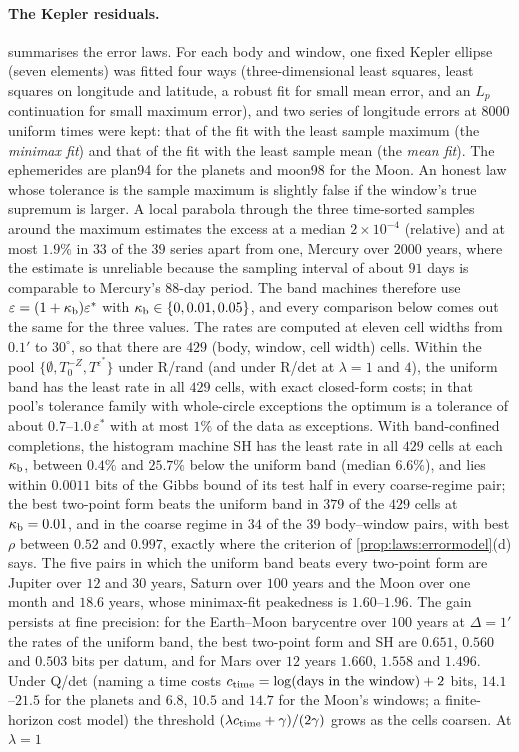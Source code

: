 \paragraph{The Kepler residuals.}  summarises the error laws. For each body and window, one fixed Kepler ellipse (seven elements) was fitted four ways (three-dimensional least squares, least squares on longitude and latitude, a robust fit for small mean error, and an $L_p$ continuation for small maximum error), and two series of longitude errors at $8000$ uniform times were kept: that of the fit with the least sample maximum (the \emph{minimax fit}) and that of the fit with the least sample mean (the \emph{mean fit}). The ephemerides are plan94 for the planets and moon98 for the Moon. An honest law whose tolerance is the sample maximum is slightly false if the window's true supremum is larger. A local parabola through the three time-sorted samples around the maximum estimates the excess at a median $2\times10^{-4}$ (relative) and at most $1.9\%$ in $33$ of the $39$ series apart from one, Mercury over $2000$ years, where the estimate is unreliable because the sampling interval of about $91$ days is comparable to Mercury's $88$-day period. The band machines therefore use $\varepsilon=(1+\kappa_{\rm b})\varepsilon^*$ with $\kappa_{\rm b}\in\{0,0.01,0.05\}$, and every comparison below comes out the same for the three values. The rates are computed at eleven cell widths from $0.1'$ to $30^\circ$, so that there are $429$ (body, window, cell width) cells. Within the pool $\{\emptyset,T_0^{-Z},T^{\varepsilon^*}\}$ under R/rand (and under R/det at $\lambda=1$ and $4$), the uniform band has the least rate in all $429$ cells, with exact closed-form costs; in that pool's tolerance family with whole-circle exceptions the optimum is a tolerance of about $0.7$--$1.0\,\varepsilon^*$ with at most $1\%$ of the data as exceptions. With band-confined completions, the histogram machine SH has the least rate in all $429$ cells at each $\kappa_{\rm b}$, between $0.4\%$ and $25.7\%$ below the uniform band (median $6.6\%$), and lies within $0.0011$ bits of the Gibbs bound of its test half in every coarse-regime pair; the best two-point form beats the uniform band in $379$ of the $429$ cells at $\kappa_{\rm b}=0.01$, and in the coarse regime in $34$ of the $39$ body--window pairs, with best $\rho$ between $0.52$ and $0.997$, exactly where the criterion of \cref{prop:laws:errormodel}(d) says. The five pairs in which the uniform band beats every two-point form are Jupiter over $12$ and $30$ years, Saturn over $100$ years and the Moon over one month and $18.6$ years, whose minimax-fit peakedness is $1.60$--$1.96$. The gain persists at fine precision: for the Earth--Moon barycentre over $100$ years at $\Delta=1'$ the rates of the uniform band, the best two-point form and SH are $0.651$, $0.560$ and $0.503$ bits per datum, and for Mars over $12$ years $1.660$, $1.558$ and $1.496$. Under Q/det (naming a time costs $c_{\rm time}=\log(\text{days in the window})+2$ bits, $14.1$--$21.5$ for the planets and $6.8$, $10.5$ and $14.7$ for the Moon's windows; a finite-horizon cost model) the threshold $(\lambda c_{\rm time}+\gamma)/(2\gamma)$ grows as the cells coarsen. At $\lambda=1$ 